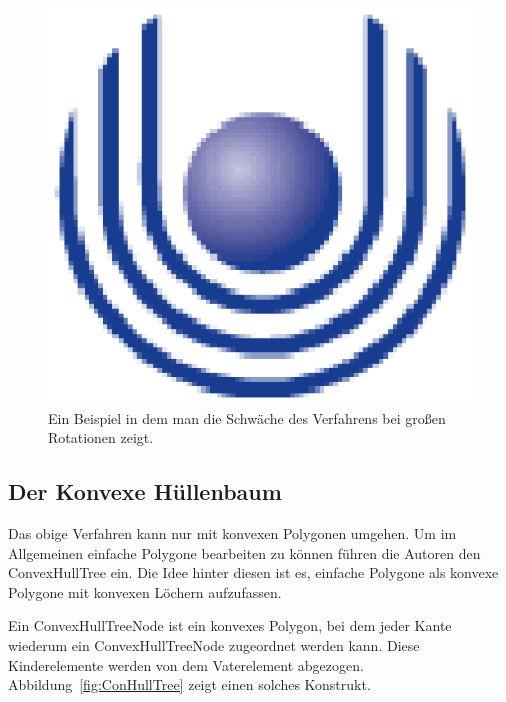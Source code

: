 \begin{figure}
	\centering
	\includegraphics{feu_logo2.eps}
	\caption{Ein Beispiel in dem man die Schwäche des Verfahrens bei großen Rotationen zeigt.}
	\label{fig:BeispielschlechteRot}
\end{figure}

\subsection{Der Konvexe Hüllenbaum}

Das obige Verfahren kann nur mit konvexen Polygonen umgehen. Um im Allgemeinen einfache Polygone bearbeiten zu können führen die Autoren den ConvexHullTree ein. Die Idee hinter diesen ist es, einfache Polygone als konvexe Polygone mit konvexen Löchern aufzufassen. 

Ein ConvexHullTreeNode ist ein konvexes Polygon, bei dem jeder Kante wiederum ein ConvexHullTreeNode zugeordnet werden kann. Diese Kinderelemente werden von dem Vaterelement abgezogen. Abbildung~\ref{fig:ConHullTree} zeigt einen solches Konstrukt.

